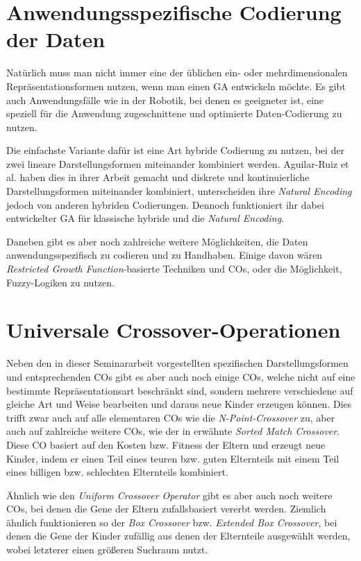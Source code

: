 \section{Anwendungsspezifische Codierung der Daten}
\label{sec:AnwSpezCod}

	Natürlich muss man nicht immer eine der üblichen ein- oder mehrdimensionalen Repräsentationsformen nutzen, wenn man einen GA entwickeln möchte. Es gibt auch Anwendungsfälle wie \zB in der Robotik, \cite{GABook} bei denen es geeigneter ist, eine speziell für die Anwendung zugeschnittene und optimierte Daten-Codierung zu nutzen.
	
	Die einfachste Variante dafür ist eine Art hybride Codierung zu nutzen, bei der zwei lineare Darstellungsformen miteinander kombiniert werden. Aguilar-Ruiz et al. haben dies in ihrer Arbeit \cite{NaturalCoding} gemacht und diskrete und kontinuierliche Darstellungsformen miteinander kombiniert, unterscheiden ihre \textit{Natural Encoding} jedoch von anderen hybriden Codierungen. Dennoch funktioniert ihr dabei entwickelter GA für klassische hybride und die \textit{Natural Encoding}.
	
	Daneben gibt es aber noch zahlreiche weitere Möglichkeiten, die Daten anwendungsspezifisch zu codieren und zu Handhaben. Einige davon wären \zB \textit{Restricted Growth Function}-basierte Techniken und COs, \cite{RestrictedGrowthFunction} oder die Mög\-lich\-keit, Fuzzy-Logiken zu nutzen. \cite{FuzzyEncoding}

\section{Universale Crossover-Operationen}
\label{sec:UnivOp}

	Neben den in dieser Seminararbeit vorgestellten spezifischen Darstellungsformen und entsprechenden COs gibt es aber auch noch einige COs, welche nicht auf eine bestimmte Repräsentationsart beschränkt sind, sondern mehrere verschiedene auf gleiche Art und Weise bearbeiten und daraus neue Kinder erzeugen können. Dies trifft zwar auch auf alle elementaren COs wie die \textit{N-Point-Crossover} zu, aber auch auf zahlreiche weitere COs, wie \zB der in \cite{COforPermutations} erwähnte \textit{Sorted Match Crossover}. Diese CO basiert auf den Kosten bzw. Fitness der Eltern und erzeugt neue Kinder, indem er einen Teil eines teuren bzw. guten Elternteils mit einem Teil eines billigen bzw. schlechten Elternteils kombiniert.
	
	Ähnlich wie den \textit{Uniform Crossover Operator} gibt es aber auch noch weitere COs, bei denen die Gene der Eltern zufallsbasiert vererbt werden. Ziemlich ähnlich funktionieren so \zB der \textit{Box Crossover} bzw. \textit{Extended Box Crossover}, bei denen die Gene der Kinder zufällig aus denen der Elternteile ausgewählt werden, wobei letzterer einen größeren Suchraum nutzt. \cite{BoxCrossover}
	
